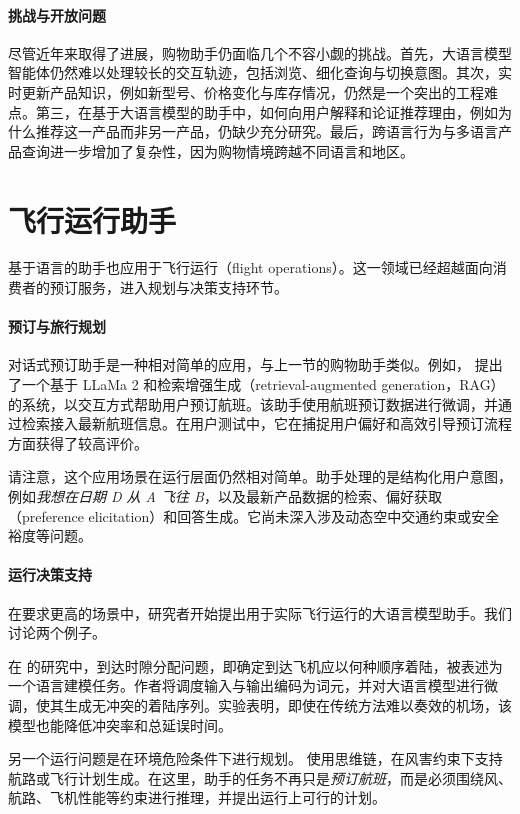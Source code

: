 \paragraph{挑战与开放问题}
尽管近年来取得了进展，购物助手仍面临几个不容小觑的挑战。首先，大语言模型智能体仍然难以处理较长的交互轨迹，包括浏览、细化查询与切换意图。其次，实时更新产品知识，例如新型号、价格变化与库存情况，仍然是一个突出的工程难点。第三，在基于大语言模型的助手中，如何向用户解释和论证推荐理由，例如为什么推荐这一产品而非另一产品，仍缺少充分研究。最后，跨语言行为与多语言产品查询进一步增加了复杂性，因为购物情境跨越不同语言和地区。

\section{飞行运行助手}

基于语言的助手也应用于飞行运行（flight operations）。这一领域已经超越面向消费者的预订服务，进入规划与决策支持环节。

\paragraph{预订与旅行规划}
对话式预订助手是一种相对简单的应用，与上一节的购物助手类似。例如，\citet{manasa2024towards} 提出了一个基于 LLaMa 2 和检索增强生成（retrieval-augmented generation，RAG）的系统，以交互方式帮助用户预订航班。该助手使用航班预订数据进行微调，并通过检索接入最新航班信息。在用户测试中，它在捕捉用户偏好和高效引导预订流程方面获得了较高评价。

请注意，这个应用场景在运行层面仍然相对简单。助手处理的是结构化用户意图，例如{\em 我想在日期 D 从 A 飞往 B}，以及最新产品数据的检索、偏好获取（preference elicitation）和回答生成。它尚未深入涉及动态空中交通约束或安全裕度等问题。

\paragraph{运行决策支持}
在要求更高的场景中，研究者开始提出用于实际飞行运行的大语言模型助手。我们讨论两个例子。

在 \citet{zhou2024flight} 的研究中，到达时隙分配问题，即确定到达飞机应以何种顺序着陆，被表述为一个语言建模任务。作者将调度输入与输出编码为词元，并对大语言模型进行微调，使其生成无冲突的着陆序列。实验表明，即使在传统方法难以奏效的机场，该模型也能降低冲突率和总延误时间。

另一个运行问题是在环境危险条件下进行规划。\citet{tabrizian2024using} 使用思维链，在风害约束下支持航路或飞行计划生成。在这里，助手的任务不再只是{\em 预订航班}，而是必须围绕风、航路、飞机性能等约束进行推理，并提出运行上可行的计划。

